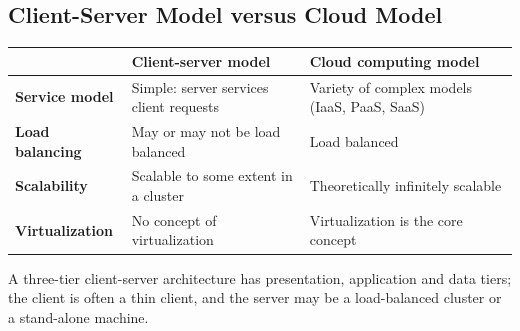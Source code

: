 \documentclass[11pt,a4paper,openany]{report}
\begin{document}
\subsection{Client-Server Model versus Cloud Model}
\begin{center}
\begin{tabularx}{\textwidth}{>{\bfseries}XXX}
\toprule
 & Client-server model & Cloud computing model\\
\midrule
Service model & Simple: server services client requests & Variety of complex models (IaaS, PaaS, SaaS)\\
Load balancing & May or may not be load balanced & Load balanced\\
Scalability & Scalable to some extent in a cluster & Theoretically infinitely scalable\\
Virtualization & No concept of virtualization & Virtualization is the core concept\\
\bottomrule
\end{tabularx}
\end{center}
A three-tier client-server architecture has presentation, application and data tiers; the client is often a
thin client, and the server may be a load-balanced cluster or a stand-alone machine.
\end{document}

